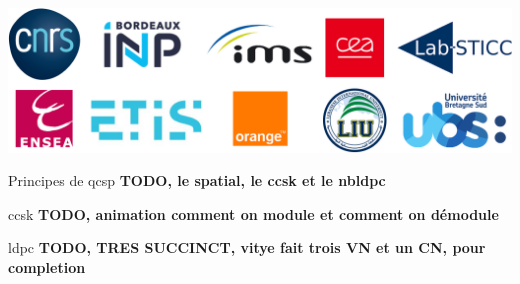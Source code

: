 \documentclass[../main.tex]{subfiles}
\begin{document}
\begin{frame}{\subsecname}{}
  \begin{center}
    \includegraphics[width=0.6\linewidth]{figures/logos-thesis/partners-logos.png}
  \end{center}
\end{frame}

\begin{frame}{Principes de \acrshort{qcsp}}
  \textbf{TODO, le spatial, le ccsk et le nbldpc}
\end{frame}

\begin{frame}{\acrfull{ccsk}}
  \textbf{TODO, animation comment on module et comment on démodule}
\end{frame}

\begin{frame}{\acrfull{ldpc}}
  \textbf{TODO, TRES SUCCINCT, vitye fait trois VN et un CN, pour completion}
\end{frame}
\end{document}
